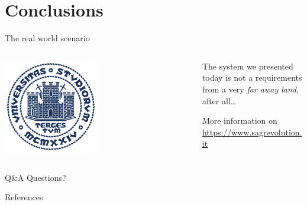 

\section[Conclusions]{Conclusions}

\begin{frame}{The real world scenario}
	\begin{columns}
		\begin{column}{0.5\textwidth}  %
			\begin{center}
			 \includegraphics[width=0.5\textwidth]{images/units.pdf}
			 \end{center}
		\end{column}
		\begin{column}{0.5\textwidth}
			The system we presented today is not a requirements from a very
			\textit{far away land}, after all\dots

			More information on \url{https://www.sagrevolution.it}
		\end{column}
	\end{columns}
\end{frame}

\begin{frame}{Q\&A}
	Questions?
\end{frame}

\begin{frame}{References}
	\printbibliography[heading=none]
\end{frame}